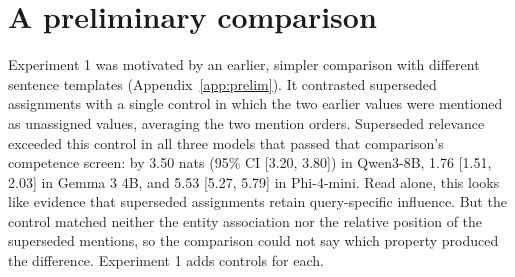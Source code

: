 \section{A preliminary comparison}
\label{sec:prelim}

Experiment 1 was motivated by an earlier, simpler comparison with different sentence templates (Appendix~\ref{app:prelim}). It contrasted superseded assignments with a single control in which the two earlier values were mentioned as unassigned values, averaging the two mention orders. Superseded relevance exceeded this control in all three models that passed that comparison's competence screen: by 3.50 nats (95\% CI [3.20, 3.80]) in Qwen3-8B, 1.76 [1.51, 2.03] in Gemma 3 4B, and 5.53 [5.27, 5.79] in Phi-4-mini. Read alone, this looks like evidence that superseded assignments retain query-specific influence. But the control matched neither the entity association nor the relative position of the superseded mentions, so the comparison could not say which property produced the difference. Experiment 1 adds controls for each.
